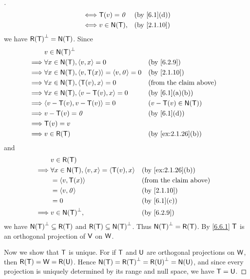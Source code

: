 \begin{proof}[]
\begin{align*}
    \iff & \T(v) = \zv                           &  & \by{6.1}[d]                   \\
    \iff & v \in \ns{\T},                        &  & \by{2.1.10}
  \end{align*}
  we have \(\rg{\T}^{\perp} = \ns{\T}\).
  Since
  \begin{align*}
             & v \in \ns{\T}^{\perp}                                                                       \\
    \implies & \forall x \in \ns{\T}, \inn{v, x} = 0                    &  & \by{6.2.9}                    \\
    \implies & \forall x \in \ns{\T}, \inn{v, \T(x)} = \inn{v, \zv} = 0 &  & \by{2.1.10}                   \\
    \implies & \forall x \in \ns{\T}, \inn{\T(v), x} = 0                &  & \text{(from the claim above)} \\
    \implies & \forall x \in \ns{\T}, \inn{v - \T(v), x} = 0            &  & \by{6.1}[a,b]                 \\
    \implies & \inn{v - \T(v), v - \T(v)} = 0                           &  & (v - \T(v) \in \ns{\T})       \\
    \implies & v - \T(v) = \zv                                          &  & \by{6.1}[d]                   \\
    \implies & \T(v) = v                                                                                   \\
    \implies & v \in \rg{\T}                                            &  & \by{ex:2.1.26}[b]
  \end{align*}
  and
  \begin{align*}
             & v \in \rg{\T}                                                                         \\
    \implies & \forall x \in \ns{\T}, \inn{v, x} = \inn{\T(v), x} &  & \by{ex:2.1.26}[b]             \\
             & = \inn{v, \T(x)}                                   &  & \text{(from the claim above)} \\
             & = \inn{v, \zv}                                     &  & \by{2.1.10}                   \\
             & = 0                                                &  & \by{6.1}[c]                   \\
    \implies & v \in \ns{\T}^{\perp},                             &  & \by{6.2.9}
  \end{align*}
  we have \(\ns{\T}^{\perp} \subseteq \rg{\T}\) and \(\rg{\T} \subseteq \ns{\T}^{\perp}\).
  Thus \(\ns{\T}^{\perp} = \rg{\T}\).
  By \cref{6.6.1} \(\mathsf{T}\) is an orthogonal projection of \(\mathsf{V}\) on \(\mathsf{W}\).

  Now we show that \(\mathsf{T}\) is unique.
  For if \(\mathsf{T}\) and \(\mathsf{U}\) are orthogonal projections on \(\mathsf{W}\), then \(\rg{\T} = \W = \rg{\U}\).
  Hence \(\ns{\T} = \rg{\T}^{\perp} = \rg{\U}^{\perp} = \ns{\U}\), and since every projection is uniquely determined by its range and null space, we have \(\mathsf{T} = \mathsf{U}\).
\end{proof}

